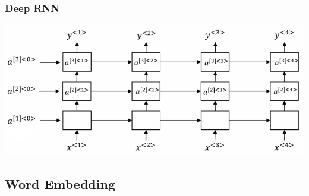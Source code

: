 \documentclass[11pt, a4paper]{article}
\begin{document}
\begin{spacing}{1.1}
	\subsubsection{Deep RNN}
	\begin{center}
	\includegraphics[scale=.7]{deep_rnn}
	\end{center} \newpage

	\subsection{Word Embedding}

\end{spacing}
\end{document}
